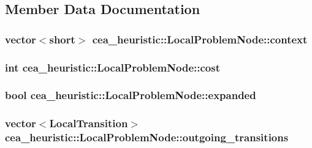 \subsection{Member Data Documentation}
\hypertarget{structcea__heuristic_1_1LocalProblemNode_a5d965175a8b3062347961ed600c70be4}{
\subsubsection[{context}]{\setlength{\rightskip}{0pt plus 5cm}vector$<$short$>$ cea\-\_\-heuristic\-::\-Local\-Problem\-Node\-::context}}\label{structcea__heuristic_1_1LocalProblemNode_a5d965175a8b3062347961ed600c70be4}
\hypertarget{structcea__heuristic_1_1LocalProblemNode_a87c14cc5411889dfcb28698a8e0b9e85}{
\subsubsection[{cost}]{\setlength{\rightskip}{0pt plus 5cm}int cea\-\_\-heuristic\-::\-Local\-Problem\-Node\-::cost}}\label{structcea__heuristic_1_1LocalProblemNode_a87c14cc5411889dfcb28698a8e0b9e85}
\hypertarget{structcea__heuristic_1_1LocalProblemNode_ab67974efdbdd4bc581e7b7f986139115}{
\subsubsection[{expanded}]{\setlength{\rightskip}{0pt plus 5cm}bool cea\-\_\-heuristic\-::\-Local\-Problem\-Node\-::expanded}}\label{structcea__heuristic_1_1LocalProblemNode_ab67974efdbdd4bc581e7b7f986139115}
\hypertarget{structcea__heuristic_1_1LocalProblemNode_aa688fc7b8d3e5a20bd4626a241ccf4df}{
\subsubsection[{outgoing\-\_\-transitions}]{\setlength{\rightskip}{0pt plus 5cm}vector$<${\bf Local\-Transition}$>$ cea\-\_\-heuristic\-::\-Local\-Problem\-Node\-::outgoing\-\_\-transitions}}\label{structcea__heuristic_1_1LocalProblemNode_aa688fc7b8d3e5a20bd4626a241ccf4df}
